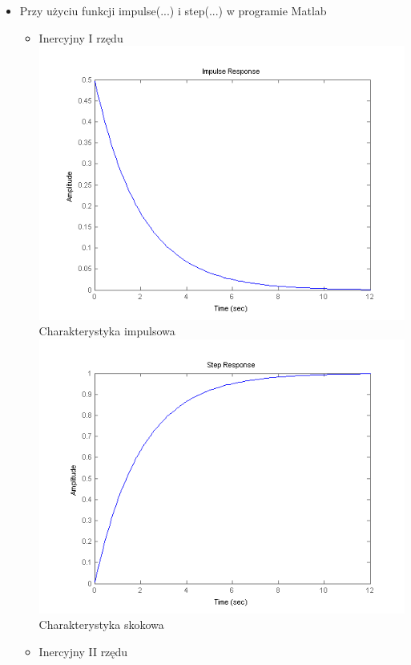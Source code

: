 \documentclass[a4paper,10pt]{article}
\begin{document}
\begin{itemize}
\item Przy użyciu funkcji impulse(...) i step(...) w programie Matlab
\begin{itemize}
\item Inercyjny I rzędu
\newline \includegraphics[scale=0.9]{CW1-inercyjny1-impuls.png}\newline Charakterystyka impulsowa
\newline \includegraphics[scale=0.9]{CW1-inercyjny1-skok.png}\newline Charakterystyka skokowa
\newpage
\item Inercyjny II rzędu 

\end{itemize}
\end{itemize}
\end{document}
